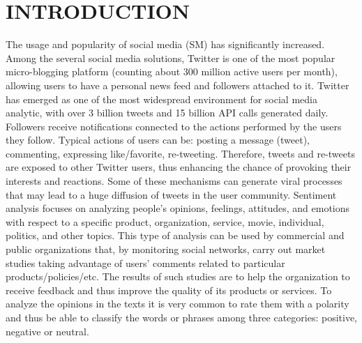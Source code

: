 \documentclass[preprint,12pt]{elsarticle}
\begin{document}

\section{INTRODUCTION}
\label{S:1}

The usage and popularity of social media (SM) has significantly increased. Among the several social media solutions, Twitter is one of the most popular micro-blogging platform (counting about 300 million active users per month), allowing users to have a personal news feed and followers attached to it. Twitter has emerged as one of the most widespread environment for social media analytic, with over 3 billion tweets and 15 billion API calls generated daily. Followers receive notifications connected to the actions performed by the users they follow. Typical actions of users can be: posting a message (tweet), commenting, expressing like/favorite, re-tweeting. Therefore, tweets and re-tweets are exposed to other Twitter users, thus enhancing the chance of provoking their interests and reactions. Some of these mechanisms can generate viral processes that may lead to a huge diffusion of tweets in the user community. Sentiment analysis focuses on analyzing people’s opinions, feelings, attitudes, and emotions with respect to a specific product, organization, service, movie, individual, politics, and other topics. This type of analysis can be used by commercial and public organizations that, by monitoring social networks, carry out market studies taking advantage of users’ comments related to particular products/policies/etc. The results of such studies are to help the organization to receive feedback and thus improve the quality of its products or services. 
To analyze the opinions in the texts it is very common to rate them with a polarity and thus be able to classify the words or phrases among three categories: positive, negative or neutral.\\
\end{document}
